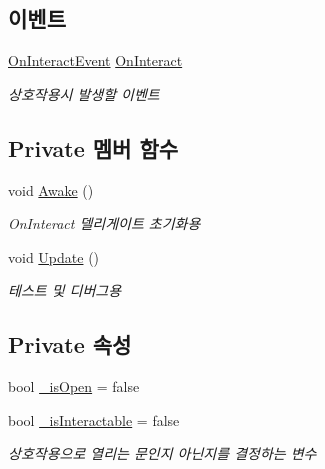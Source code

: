 \subsection*{이벤트}
\begin{DoxyCompactItemize}
\item 
\mbox{\hyperlink{class_interactable_object_a70a579e4b09d53e6cb77b5222189d5eb}{On\+Interact\+Event}} \mbox{\hyperlink{class_interactable_object_afe5e0b16d86c2ed4abf4a71a1995f7ae}{On\+Interact}}
\begin{DoxyCompactList}\small\item\em 상호작용시 발생할 이벤트 \end{DoxyCompactList}\end{DoxyCompactItemize}
\subsection*{Private 멤버 함수}
\begin{DoxyCompactItemize}
\item 
void \mbox{\hyperlink{class_door_a516f170e7be1fccf24a8286cdda4f8cf}{Awake}} ()
\begin{DoxyCompactList}\small\item\em On\+Interact 델리게이트 초기화용 \end{DoxyCompactList}\item 
void \mbox{\hyperlink{class_door_ac518336e578c8c5f447da92d427716fc}{Update}} ()
\begin{DoxyCompactList}\small\item\em 테스트 및 디버그용 \end{DoxyCompactList}\end{DoxyCompactItemize}
\subsection*{Private 속성}
\begin{DoxyCompactItemize}
\item 
bool \mbox{\hyperlink{class_door_a12b7b3e47b01336511c2e4a986d584e2}{\+\_\+is\+Open}} = false
\item 
bool \mbox{\hyperlink{class_door_a36402db70ad8e766d282355921c3f525}{\+\_\+is\+Interactable}} = false
\begin{DoxyCompactList}\small\item\em 상호작용으로 열리는 문인지 아닌지를 결정하는 변수 \end{DoxyCompactList}\end{DoxyCompactItemize}


